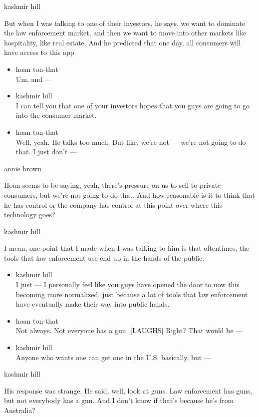 kashmir hill

But when I was talking to one of their investors, he says, we want to
dominate the law enforcement market, and then we want to move into other
markets like hospitality, like real estate. And he predicted that one
day, all consumers will have access to this app.

\begin{itemize}
\item
  hoan ton-that\\
  Um, and ---
\item
  kashmir hill\\
  I can tell you that one of your investors hopes that you guys are
  going to go into the consumer market.
\item
  hoan ton-that\\
  Well, yeah. He talks too much. But like, we're not --- we're not going
  to do that. I just don't ---
\end{itemize}

annie brown

Hoan seems to be saying, yeah, there's pressure on us to sell to private
consumers, but we're not going to do that. And how reasonable is it to
think that he has control or the company has control at this point over
where this technology goes?

kashmir hill

I mean, one point that I made when I was talking to him is that
oftentimes, the tools that law enforcement use end up in the hands of
the public.

\begin{itemize}
\item
  kashmir hill\\
  I just --- I personally feel like you guys have opened the door to now
  this becoming more normalized, just because a lot of tools that law
  enforcement have eventually make their way into public hands.
\item
  hoan ton-that\\
  Not always. Not everyone has a gun. {[}LAUGHS{]} Right? That would be
  ---
\item
  kashmir hill\\
  Anyone who wants one can get one in the U.S. basically, but ---
\end{itemize}

kashmir hill

His response was strange. He said, well, look at guns. Law enforcement
has guns, but not everybody has a gun. And I don't know if that's
because he's from Australia?

